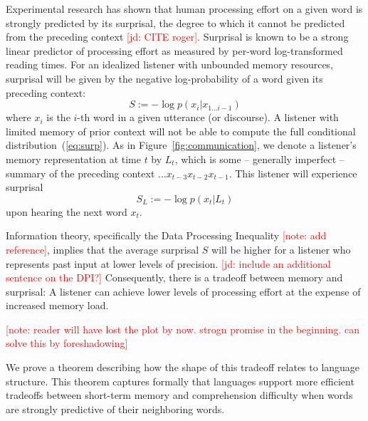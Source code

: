 \documentclass[12pt]{article}
\newcounter{theorem}
\newcommand{\jd}[1]{\textcolor{Red}{[jd: #1]}}
\newcommand{\note}[1]{\textcolor{Red}{[note: #1]}}
\begin{document}
Experimental research has shown that human processing effort on a given word is strongly predicted by its surprisal, the degree to which it cannot be predicted from the preceding context \jd{CITE roger}.
Surprisal is known to be a strong linear predictor of processing effort as measured by per-word log-transformed reading times.
For an idealized listener with unbounded memory resources, surprisal will be given by the negative log-probability of a word given its preceding context:
\begin{equation}\label{eq:surp}
	S :=	-\log p(x_i|x_{1...i-1})
\end{equation}
where $x_i$ is the $i$-th word in a given utterance (or discourse).
%
A listener with limited memory of prior context will not be able to compute the full conditional distribution~(\ref{eq:surp}).
As in Figure~\ref{fig:communication}, we denote a listener's memory representation at time $t$ by $L_t$, which is some -- generally imperfect -- summary of the preceding context $\dots x_{t-3}x_{t-2}x_{t-1}$.
This listener will experience surprisal
\begin{equation}\label{eq:surp-listener}
	S_L :=	-\log p(x_t|L_t)
\end{equation}
upon hearing the next word $x_t$.


Information theory, specifically the Data Processing Inequality \note{add reference}, implies that the average surprisal $S$ will be higher for a listener who represents past input at lower levels of precision. \jd{include an additional sentence on the DPI?}
Consequently, there is a tradeoff between memory and surprisal:
A listener can achieve lower levels of processing effort at the expense of increased memory load.

\note{reader will have lost the plot by now. strogn promise in the beginning. can solve this by foreshadowing}




We prove a theorem describing how the shape of this tradeoff relates to language structure. %
This theorem captures formally that languages support more efficient tradeoffs between short-term memory and comprehension difficulty when words are strongly predictive of their neighboring words.
\end{document}
